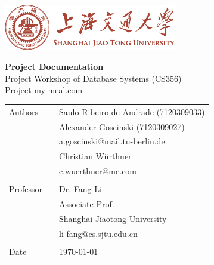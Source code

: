 \begin{titlepage}
\pagestyle{empty}

\begin{center}
\includegraphics[height=2cm]{content/graphics/sjtubannerred.pdf}
\end{center}

\vspace{20 mm}

\begin{center}
{\fontsize{28}{28} \selectfont
\textbf{Project Documentation}}\\[5mm] 
{\fontsize{16}{22}
\selectfont Project Workshop of Database Systems (CS356)\\Project my-meal.com}
\end{center}

\vfill
\begin{tabular}{lcl}

Authors     &&    Saulo Ribeiro de Andrade (7120309033) \\
            &&    Alexander Goscinski (7120309027) \\
            &&    a.goscinski@mail.tu-berlin.de \\
            &&    Christian Würthner  \\
            &&    c.wuerthner@me.com\\\\
Professor   &&    Dr. Fang Li\\ 
            &&    Associate Prof.\\
            &&    Shanghai Jiaotong University\\
            &&    li-fang@cs.sjtu.edu.cn\\\\
Date	        &&    \today\\ 
\end{tabular}
\end{titlepage}
